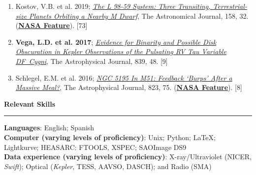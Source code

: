 \documentclass[letter,11pt]{article}
\begin{document}
\begin{enumerate}[\bfseries 1.]
\item Kostov, V.B. et al. 2019; \href{https://ui.adsabs.harvard.edu/abs/2019AJ....158...32K/abstract}{{\it The L 98-59 System: Three Transiting, Terrestrial-size Planets Orbiting a Nearby M Dwarf}}, The Astronomical Journal, 158, 32.
(\href{https://www.nasa.gov/feature/goddard/2019/nasa-s-tess-mission-finds-its-smallest-planet-yet}{\bf NASA Feature}). [73]

\item {\bf Vega, L.D. et al. 2017}; \href{https://ui.adsabs.harvard.edu/abs/2017ApJ...839...48V/abstract}{{\it Evidence for Binarity and Possible Disk Obscuration in Kepler Observations of the Pulsating RV Tau Variable DF~Cygni}}, The Astrophysical Journal, 839, 48. [9]

\item Schlegel, E.M. et al. 2016; \href{https://ui.adsabs.harvard.edu/abs/2016ApJ...823...75S/abstract}{{\it NGC 5195 In M51: Feedback ‘Burps’ After a Massive Meal?}}, The Astrophysical Journal, 823, 75. (\href{https://www.nasa.gov/mission_pages/chandra/nasa-s-chandra-finds-supermassive-black-hole-burping-nearby.html}{\bf NASA Feature}). [8]

\end{enumerate}


\noindent
{\bf Relevant Skills} \\
\vspace{-10mm}
\begin{center}
\rule{\textwidth}{0.2mm}
\end{center}
\vspace{-3mm}
\noindent
\textbf{Languages}: English; Spanish\\
\textbf{Computer (varying levels of proficiency)}: Unix; Python; LaTeX; Lightkurve; HEASARC: FTOOLS, XSPEC; SAOImage DS9 \\
\textbf{Data experience (varying levels of proficiency)}: X-ray/Ultraviolet (NICER, {\it Swift}); Optical ({\it Kepler}, TESS, AAVSO, DASCH); and Radio (SMA) \\
\end{document}
